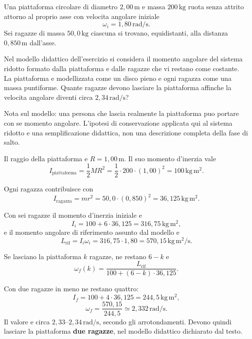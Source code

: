 
\begin{esercizio}
Una piattaforma circolare di diametro \(2{,}00\,\mathrm{m}\) e massa
\(200\,\mathrm{kg}\) ruota senza attrito attorno al proprio asse con velocita
angolare iniziale
\[
\omega_i=1{,}80\,\mathrm{rad/s}.
\]
Sei ragazze di massa \(50{,}0\,\mathrm{kg}\) ciascuna si trovano, equidistanti,
alla distanza \(0{,}850\,\mathrm{m}\) dall'asse.

Nel modello didattico dell'esercizio si considera il momento angolare del
sistema ridotto formato dalla piattaforma e dalle ragazze che vi restano come
costante. La piattaforma e modellizzata come un disco pieno e ogni ragazza come
una massa puntiforme. Quante ragazze devono lasciare la piattaforma affinche la
velocita angolare diventi circa \(2{,}34\,\mathrm{rad/s}\)?

Nota sul modello: una persona che lascia realmente la piattaforma puo
portare con se momento angolare. L'ipotesi di conservazione applicata qui al
sistema ridotto e una semplificazione didattica, non una descrizione completa
della fase di salto.
\end{esercizio}

\begin{soluzione}
Il raggio della piattaforma e \(R=1{,}00\,\mathrm{m}\). Il suo momento
d'inerzia vale
\[
I_\text{piattaforma}=\frac{1}{2}MR^2
=\frac{1}{2}\cdot 200\cdot(1{,}00)^2
=100\,\mathrm{kg\,m^2}.
\]

Ogni ragazza contribuisce con
\[
I_\text{ragazza}=mr^2
=50{,}0\cdot(0{,}850)^2
=36{,}125\,\mathrm{kg\,m^2}.
\]

Con sei ragazze il momento d'inerzia iniziale e
\[
I_i=100+6\cdot36{,}125
=316{,}75\,\mathrm{kg\,m^2},
\]
e il momento angolare di riferimento assunto dal modello e
\[
L_\text{rif}=I_i\omega_i
=316{,}75\cdot1{,}80
=570{,}15\,\mathrm{kg\,m^2/s}.
\]

Se lasciano la piattaforma \(k\) ragazze, ne restano \(6-k\) e
\[
\omega_f(k)=\frac{L_\text{rif}}
{100+(6-k)\cdot36{,}125}.
\]

Con due ragazze in meno ne restano quattro:
\[
I_f=100+4\cdot36{,}125
=244{,}5\,\mathrm{kg\,m^2},
\]
\[
\omega_f=\frac{570{,}15}{244{,}5}
\simeq2{,}332\,\mathrm{rad/s}.
\]
Il valore e circa \(2{,}33\)--\(2{,}34\,\mathrm{rad/s}\), secondo gli
arrotondamenti. Devono quindi lasciare la piattaforma \textbf{due ragazze},
nel modello didattico dichiarato dal testo.
\end{soluzione}
